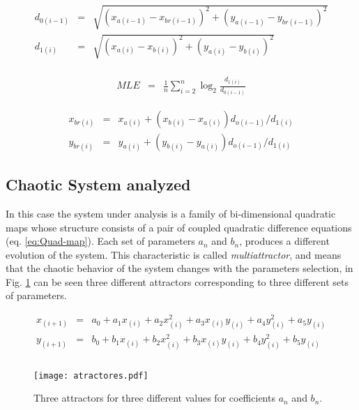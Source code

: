 \begin{eqnarray}\label{eq:D0D1}
    d_{0(i-1)}&=& \sqrt{(x_{a(i-1)}-x_{br(i-1)})^2+(y_{a(i-1)}-y_{br(i-1)})^2}\nonumber\\
    d_{1(i)}&=& \sqrt{(x_{a(i)}-x_{b(i)})^2+(y_{a(i)}-y_{b(i)})^2}\\
\nonumber
\end{eqnarray}

\begin{eqnarray}\label{eq:Lyapunov}
    MLE &=& \frac{1}{n} \sum_{i=2}^{n} \log_2{\frac{d_{1(i)}}{d_{0(i-1)}}}
\end{eqnarray}


\begin{eqnarray}\label{eq:reubicacion}
    x_{br(i)}&=& x_{a(i)}+(x_{b(i)}-x_{a(i)})d_{o(i-1)}/d_{1(i)} \nonumber\\
    y_{br(i)}&=& y_{a(i)}+(y_{b(i)}-y_{a(i)})d_{o(i-1)}/d_{1(i)}
\end{eqnarray}




\subsection{Chaotic System analyzed}

In this case the system under analysis is a family of
bi-dimensional quadratic maps whose structure consists of a pair
of coupled quadratic difference equations (eq. \ref{eq:Quad-map}).
Each set of parameters $a_n$ and $b_n$, produces a different
evolution of the system. This characteristic is called
\textit{multiattractor}, and means that the chaotic behavior of
the system changes with the parameters selection, in Fig.
\ref{fig:atractores} can be seen three different attractors
corresponding to three different sets of parameters.
{ \small
\begin{eqnarray}\label{eq:Quad-map}
    x_{(i+1)}&=& a_0 + a_1 x_{(i)} + a_2 x_{(i)}^2 + a_3 x_{(i)} y_{(i)} + a_4 y_{(i)}^2 + a_5 y_{(i)} \nonumber\\
    y_{(i+1)}&=& b_0 + b_1 x_{(i)} + b_2 x_{(i)}^2 + b_3 x_{(i)} y_{(i)} + b_4 y_{(i)}^2 + b_5 y_{(i)}\nonumber\\
\\
\nonumber \end{eqnarray}

}

\begin{figure}
    \centering
    \texttt{[image: atractores.pdf]}\\
    \caption{Three attractors for three different values for coefficients $a_n$ and $b_n$.}\label{fig:atractores}
\end{figure}


